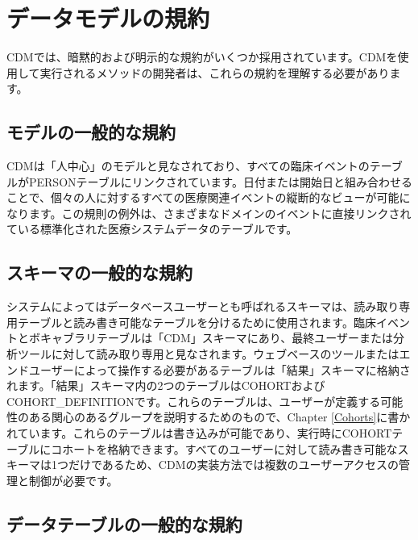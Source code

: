 \documentclass[
  11pt]{book}
\theoremstyle{definition}
\theoremstyle{definition}
\theoremstyle{definition}
\theoremstyle{definition}
\theoremstyle{remark}
\begin{document}
\section{データモデルの規約}\label{ux30c7ux30fcux30bfux30e2ux30c7ux30ebux306eux898fux7d04}

CDMでは、暗黙的および明示的な規約がいくつか採用されています。CDMを使用して実行されるメソッドの開発者は、これらの規約を理解する必要があります。

\subsection{モデルの一般的な規約}\label{model-Conv}

CDMは「人中心」のモデルと見なされており、すべての臨床イベントのテーブルがPERSONテーブルにリンクされています。日付または開始日と組み合わせることで、個々の人に対するすべての医療関連イベントの縦断的なビューが可能になります。この規則の例外は、さまざまなドメインのイベントに直接リンクされている標準化された医療システムデータのテーブルです。

\subsection{スキーマの一般的な規約}\label{ux30b9ux30adux30fcux30deux306eux4e00ux822cux7684ux306aux898fux7d04}

システムによってはデータベースユーザーとも呼ばれるスキーマは、読み取り専用テーブルと読み書き可能なテーブルを分けるために使用されます。臨床イベントとボキャブラリテーブルは「CDM」スキーマにあり、最終ユーザーまたは分析ツールに対して読み取り専用と見なされます。ウェブベースのツールまたはエンドユーザーによって操作する必要があるテーブルは「結果」スキーマに格納されます。「結果」スキーマ内の2つのテーブルはCOHORTおよびCOHORT\_DEFINITIONです。これらのテーブルは、ユーザーが定義する可能性のある関心のあるグループを説明するためのもので、Chapter \ref{Cohorts}に書かれています。これらのテーブルは書き込みが可能であり、実行時にCOHORTテーブルにコホートを格納できます。すべてのユーザーに対して読み書き可能なスキーマは1つだけであるため、CDMの実装方法では複数のユーザーアクセスの管理と制御が必要です。

\subsection{データテーブルの一般的な規約}\label{ux30c7ux30fcux30bfux30c6ux30fcux30d6ux30ebux306eux4e00ux822cux7684ux306aux898fux7d04}
\end{document}
